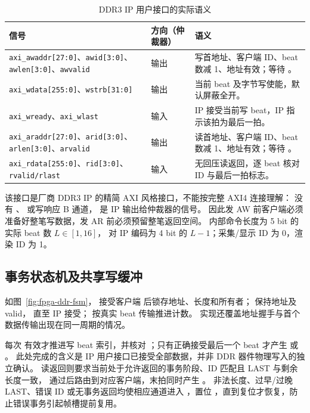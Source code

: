 \begin{table}[htbp]\centering\small
\caption{DDR3 IP 用户接口的实际语义}\label{tab:fpga-ddr-interface}
\begin{tabularx}{\textwidth}{p{5.0cm}p{2.2cm}Y}
\toprule 信号 & 方向（仲裁器） & 语义 \\\midrule
\mbox{\texttt{axi\_awaddr[27:0]}}、\mbox{\texttt{awid[3:0]}}、\mbox{\texttt{awlen[3:0]}}、\mbox{\texttt{awvalid}} & 输出 & 写首地址、客户端 ID、beat 数减 1、地址有效；等待 。\\
\mbox{\texttt{axi\_wdata[255:0]}}、\mbox{\texttt{wstrb[31:0]}} & 输出 & 当前 beat 及字节写使能，默认屏蔽全开。\\
\mbox{\texttt{axi\_wready}}、\mbox{\texttt{axi\_wlast}} & 输入 & IP 接受当前写 beat，IP 指示该拍为最后一拍。\\
\mbox{\texttt{axi\_araddr[27:0]}}、\mbox{\texttt{arid[3:0]}}、\mbox{\texttt{arlen[3:0]}}、\mbox{\texttt{arvalid}} & 输出 & 读首地址、客户端 ID、beat 数减 1、地址有效；等待 。\\
\mbox{\texttt{axi\_rdata[255:0]}}、\mbox{\texttt{rid[3:0]}}、\mbox{\texttt{rvalid/rlast}} & 输入 & 无回压读返回，逐 beat 核对 ID 与最后一拍标志。\\
\bottomrule
\end{tabularx}
\end{table}
该接口是厂商 DDR3 IP 的精简 AXI 风格接口，不能按完整 AXI4 连接理解：
没有 、 或写响应 B 通道，
 是 IP 输出给仲裁器的信号。
因此发 AW 前客户端必须准备好整笔写数据，发 AR 前必须预留整笔返回空间。
内部命令长度为 5 bit 的实际 beat 数 $L\in[1,16]$，
对 IP 编码为 4 bit 的 $L-1$；采集/显示 ID 为 0，渲染 ID 为 1。

\subsection{事务状态机及共享写缓冲}
如图~\ref{fig:fpga-ddr-fsm}， 接受客户端
 后锁存地址、长度和所有者； 保持地址及 valid，
直至 IP 接受； 按真实 beat 传输推进计数。
实现还覆盖地址握手与首个数据传输出现在同一周期的情况。


每次  有效才推进写 beat 索引，并核对
；只有正确接受最后一个 beat 才产生
 或 。
此处完成的含义是 IP 用户接口已接受全部数据，并非 DDR 器件物理写入的独立确认。
读返回则要求当前处于允许返回的事务阶段、ID 匹配且 LAST 与剩余长度一致，
通过后路由到对应客户端，末拍同时产生 。
非法长度、过早/过晚 LAST、错误 ID 或无事务返回均使相应通道进入
，置位 ，直到复位才恢复，防止错误事务引起帧槽提前复用。


